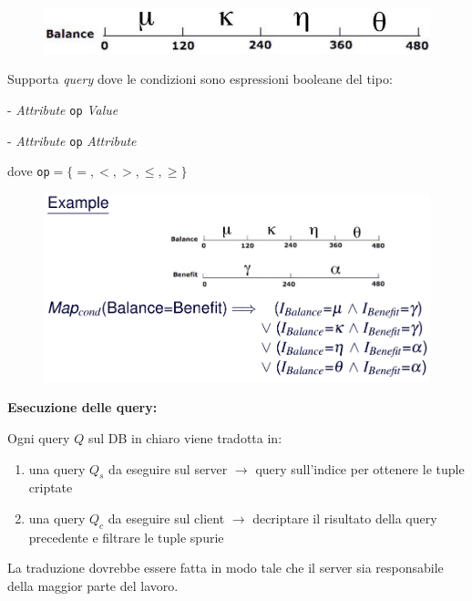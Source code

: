 \documentclass{report}
\begin{document}
\begin{itemize}
\begin{itemize}
        \begin{figure}[ht]
            \centering
            \includegraphics[width=0.6\linewidth]{images/encryption/partion-based-index.png}
        \end{figure}

        \noindent Supporta \textit{query} dove le condizioni sono espressioni booleane del tipo:

        - \textit{Attribute} \texttt{op} \textit{Value}

        - \textit{Attribute} \texttt{op} \textit{Attribute}

        dove \texttt{op}$=\{ =, <, >, \leq, \geq \}$

        \begin{figure}[ht]
            \centering
            \includegraphics[width=0.6\linewidth]{images/encryption/partition-based-ex.png}
        \end{figure}

        \noindent \textbf{Esecuzione delle query:}

        \noindent Ogni query $Q$ sul DB in chiaro viene tradotta in:
        \begin{enumerate}
            \item una query $Q_s$ da eseguire sul server $\rightarrow$ query sull'indice per ottenere le tuple criptate
            \item una query $Q_c$ da eseguire sul client $\rightarrow$ decriptare il risultato della query precedente e filtrare le tuple spurie
        \end{enumerate}

        La traduzione dovrebbe essere fatta in modo tale che il server sia responsabile 
        della maggior parte del lavoro.


\end{itemize}
\end{itemize}
\end{document}
